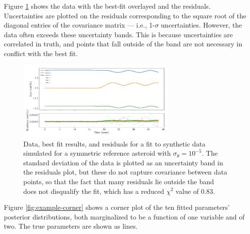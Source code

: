 \documentclass{aastex631}
\begin{document}
Figure \ref{fig:example-residuals} shows the data with the best-fit overlayed and the residuals. Uncertainties are plotted on the residuals corresponding to the square root of the diagonal entries of the covariance matrix --- i.e., 1-$\sigma$ uncertainties. However, the data often exceeds these uncertainty bands. This is because uncertainties are correlated in truth, and points that fall outside of the band are not necessary in conflict with the best fit.

\begin{figure}
  \centering
  \includegraphics[width=0.7\textwidth]{example-residuals.pdf}
  \caption{Data, best fit results, and residuals for a fit to synthetic data simulated for a symmetric reference asteroid with $\sigma_\theta = 10^{-5}$. The standard deviation of the data is plotted as an uncertainty band in the residuals plot, but these do not capture covariance between data points, so that the fact that many residuals lie outside the band does not disqualify the fit, which has a reduced $\chi^2$ value of 0.83.}
  \label{fig:example-residuals}
\end{figure}

Figure \ref{fig:example-corner} shows a corner plot of the ten fitted parameters' posterior distributions, both marginalized to be a function of one variable and of two. The true parameters are shown as lines.
\end{document}
